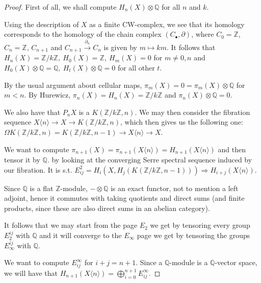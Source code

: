 \documentclass{article}
\newcommand{\numberset}{\mathbb}
\newcommand{\Z}{\numberset{Z}}
\newcommand{\Q}{\numberset{Q}}
\begin{document}
\begin{proof}
    First of all, we shall compute $H_n(X)\otimes\Q$ for all $n$ and $k$.

    Using the description of $X$ as a finite CW-complex, we see that its
    homology corresponds to the homology of the chain complex
    $(C_\bullet,\partial)$, where $C_0=\Z$, $C_n=\Z$, $C_{n+1}$ and
    $C_{n+1}\xrightarrow{\partial_n}C_n$ is given by $m\mapsto km$. It follows
    that $H_n(X)=\Z/k\Z,\ H_0(X)=\Z,\ H_m(X)=0$ for $m\neq 0,n$ and
    $H_0(X)\otimes\Q=\Q,\ H_t(X)\otimes\Q=0$ for all other $t$.

    By the usual argument about cellular maps, $\pi_m(X)=0=\pi_m(X)\otimes\Q$
    for $m<n$. By Hurewicz, $\pi_n(X)=H_n(X)=\Z/k\Z$ and $\pi_n(X)\otimes\Q=0$.

    We also have that $P_nX$ is a $K(\Z/k\Z,n)$. We may then consider the
    fibration sequence $X\langle n\rangle\rightarrow X\rightarrow K(\Z/k\Z,n)$,
    which then gives us the following one: $\Omega
    K(\Z/k\Z,n)=K(\Z/k\Z,n-1)\rightarrow X\langle n\rangle\rightarrow X$.

    We want to compute $\pi_{n+1}(X)=\pi_{n+1}(X\langle
    n\rangle)=H_{n+1}(X\langle n\rangle)$ and then tensor it by $\Q$. by looking
    at the converging Serre spectral sequence induced by our fibration. It is
    s.t. $E_{ij}^2=H_i(X,H_j(K(\Z/k\Z,n-1)))\Rightarrow H_{i+j}(X\langle
    n\rangle)$.
    
    Since
    $\Q$ is a flat $\Z$-module, $-\otimes\Q$ is an exact functor, not to mention
    a left adjoint, hence it commutes with taking quotients and direct sums (and
    finite products, since these are also direct sums in an abelian category).

    It follows that we may start from the page $E_2$ we get by tensoring every
    group $E^{ij}_2$ with $\Q$ and it will converge to the $E_\infty$ page we
    get by tensoring the groups $E^{ij}_\infty$ with $\Q$.

    We want to compute $E_{ij}^\infty$ for $i+j=n+1$. Since a $\Q$-module is a
    $\Q$-vector space, we will have that $H_{n+1}(X\langle
    n\rangle)=\bigoplus_{i=0}^{n+1}E_{ij}^\infty$.
\end{proof}

\printbibliography
\end{document}

